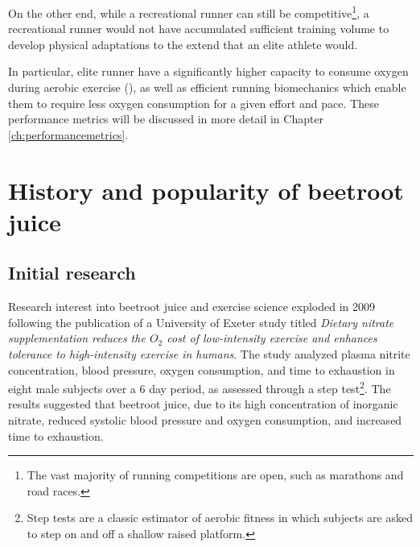 On the other end, while a recreational runner can still be competitive\footnote{The vast majority of running competitions are open, such as marathons and road races.}, a recreational runner would not have accumulated sufficient training volume to develop physical adaptations to the extend that an elite athlete would. 

In particular, elite runner have a significantly higher capacity to consume oxygen during aerobic exercise (\vot), as well as efficient running biomechanics which enable them to require less oxygen consumption for a given effort and pace\cite{daniels2013daniels}. These performance metrics will be discussed in more detail in Chapter \ref{ch:performancemetrics}.
\section{History and popularity of beetroot juice}
    \subsection{Initial research}
Research interest into beetroot juice and exercise science exploded in 2009 following the publication of a University of Exeter study titled \textit{Dietary nitrate supplementation reduces the $O_2$ cost of low-intensity exercise and enhances tolerance to high-intensity exercise in humans}. The study analyzed plasma nitrite concentration, blood pressure, oxygen consumption, and time to exhaustion
in eight male subjects over a 6 day period, as assessed through a step test\footnote{Step tests are a classic estimator of aerobic fitness in which subjects are asked to step on and off a shallow raised platform.\cite{brouha1943step}}.
The results suggested that beetroot juice, due to its high concentration of inorganic nitrate, reduced systolic blood pressure and oxygen consumption, and increased time to exhaustion\cite{bailey2009dietary}.


